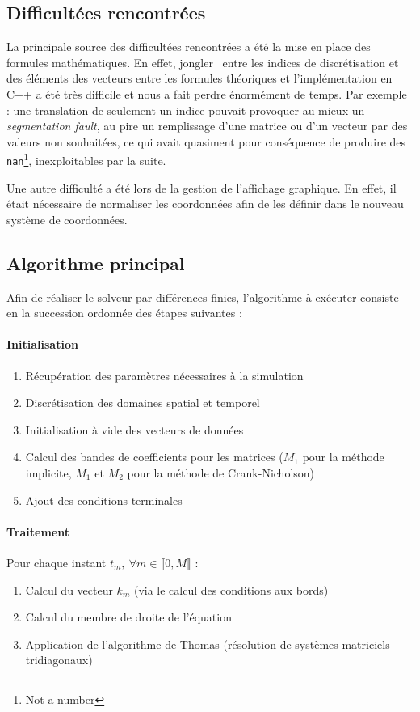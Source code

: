 \documentclass[11pt,a4paper]{article}
\newcommand*{\intval}[2]{\llbracket #1, #2 \rrbracket}
\theoremstyle{plain}
\begin{document}
\subsection{Difficultées rencontrées}
La principale source des difficultées rencontrées a été la mise en place des formules mathématiques. En effet, \og jongler \fg \ entre les indices de discrétisation et des éléments des vecteurs entre les formules théoriques et l'implémentation en C++ a été très difficile et nous a fait perdre énormément de temps.
Par exemple : une translation de seulement un indice pouvait provoquer au mieux un \textit{segmentation fault}, au pire un remplissage d'une matrice ou d'un vecteur par des valeurs non souhaitées, ce qui avait quasiment pour conséquence de produire des \texttt{nan}\footnote{Not a number}, inexploitables par la suite.

Une autre difficulté a été lors de la gestion de l'affichage graphique. En effet, il était nécessaire de normaliser les coordonnées afin de les définir dans le nouveau système de coordonnées.

\subsection{Algorithme principal}
Afin de réaliser le solveur par différences finies, l'algorithme à exécuter consiste en la succession ordonnée des étapes suivantes :

\paragraph{Initialisation}
\begin{enumerate}
    \item Récupération des paramètres nécessaires à la simulation
    \item Discrétisation des domaines spatial et temporel
    \item Initialisation à vide des vecteurs de données
    \item Calcul des bandes de coefficients pour les matrices ($M_1$ pour la méthode implicite, $M_1$ et $M_2$ pour la méthode de Crank-Nicholson)
    \item Ajout des conditions terminales
\end{enumerate}

\paragraph{Traitement} Pour chaque instant $t_m, \ \forall m \in \intval{0}{M}$ : 
\begin{enumerate}
    \item Calcul du vecteur $k_m$ (via le calcul des conditions aux bords)
    \item Calcul du membre de droite de l'équation
    \item Application de l'algorithme de Thomas (résolution de systèmes matriciels tridiagonaux)
\end{enumerate}
\end{document}
